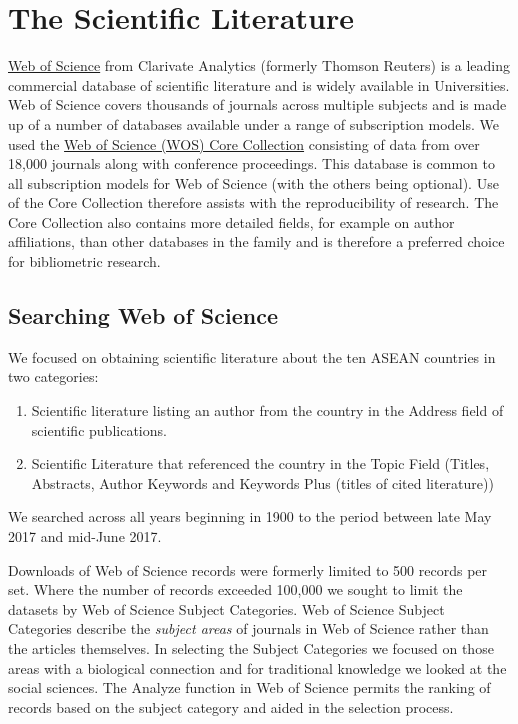 \documentclass[]{book}
\providecommand{\tightlist}{%
  \setlength{\itemsep}{0pt}\setlength{\parskip}{0pt}}
\theoremstyle{definition}
\theoremstyle{definition}
\theoremstyle{definition}
\theoremstyle{remark}
\begin{document}
\hypertarget{the-scientific-literature}{%
\section{The Scientific Literature}\label{the-scientific-literature}}

\href{https://clarivate.com/products/web-of-science/web-science-form/web-science-core-collection/}{Web
of Science} from Clarivate Analytics (formerly Thomson Reuters) is a
leading commercial database of scientific literature and is widely
available in Universities. Web of Science covers thousands of journals
across multiple subjects and is made up of a number of databases
available under a range of subscription models. We used the
\href{https://clarivate.com/products/web-of-science/web-science-form/web-science-core-collection/}{Web
of Science (WOS) Core Collection} consisting of data from over 18,000
journals along with conference proceedings. This database is common to
all subscription models for Web of Science (with the others being
optional). Use of the Core Collection therefore assists with the
reproducibility of research. The Core Collection also contains more
detailed fields, for example on author affiliations, than other
databases in the family and is therefore a preferred choice for
bibliometric research.

\hypertarget{searching-web-of-science}{%
\subsection{Searching Web of Science}\label{searching-web-of-science}}

We focused on obtaining scientific literature about the ten ASEAN
countries in two categories:

\begin{enumerate}
\def\labelenumi{\arabic{enumi}.}
\tightlist
\item
  Scientific literature listing an author from the country in the
  Address field of scientific publications.
\item
  Scientific Literature that referenced the country in the Topic Field
  (Titles, Abstracts, Author Keywords and Keywords Plus (titles of cited
  literature))
\end{enumerate}

We searched across all years beginning in 1900 to the period between
late May 2017 and mid-June 2017.

Downloads of Web of Science records were formerly limited to 500 records
per set. Where the number of records exceeded 100,000 we sought to limit
the datasets by Web of Science Subject Categories. Web of Science
Subject Categories describe the \emph{subject areas} of journals in Web
of Science rather than the articles themselves. In selecting the Subject
Categories we focused on those areas with a biological connection and
for traditional knowledge we looked at the social sciences. The Analyze
function in Web of Science permits the ranking of records based on the
subject category and aided in the selection process.
\end{document}
